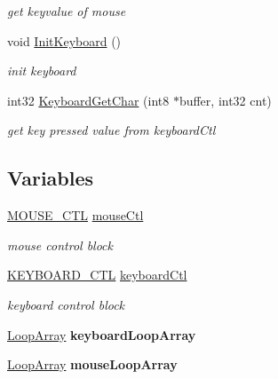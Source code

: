 \begin{DoxyCompactItemize}
\begin{DoxyCompactList}\small\item\em get keyvalue of mouse \end{DoxyCompactList}\item 
void \hyperlink{group__keyboard__mousse_ga76b51f3fb6a339a55ac945dad1272684}{Init\+Keyboard} ()
\begin{DoxyCompactList}\small\item\em init keyboard \end{DoxyCompactList}\item 
int32 \hyperlink{group__keyboard__mousse_gaf9e34965b72e06edbe9d67a16bdfde66}{Keyboard\+Get\+Char} (int8 $\ast$buffer, int32 cnt)
\begin{DoxyCompactList}\small\item\em get key pressed value from keyboard\+Ctl \end{DoxyCompactList}\end{DoxyCompactItemize}
\subsection*{Variables}
\begin{DoxyCompactItemize}
\item 
\hypertarget{group__keyboard__mousse_ga9c88598fb7517d3e0cfd01a513829f99}{}\hyperlink{struct_m_o_u_s_e___c_t_l}{M\+O\+U\+S\+E\+\_\+\+C\+T\+L} \hyperlink{group__keyboard__mousse_ga9c88598fb7517d3e0cfd01a513829f99}{mouse\+Ctl}\label{group__keyboard__mousse_ga9c88598fb7517d3e0cfd01a513829f99}

\begin{DoxyCompactList}\small\item\em mouse control block \end{DoxyCompactList}\item 
\hypertarget{group__keyboard__mousse_gadaa56bf70c720efde081a6a778a05f6a}{}\hyperlink{struct_k_e_y_b_o_a_r_d___c_t_l}{K\+E\+Y\+B\+O\+A\+R\+D\+\_\+\+C\+T\+L} \hyperlink{group__keyboard__mousse_gadaa56bf70c720efde081a6a778a05f6a}{keyboard\+Ctl}\label{group__keyboard__mousse_gadaa56bf70c720efde081a6a778a05f6a}

\begin{DoxyCompactList}\small\item\em keyboard control block \end{DoxyCompactList}\item 
\hypertarget{group__keyboard__mousse_ga6d77af0e052543e6b5e2935790fdc35e}{}\hyperlink{struct_loop_array}{Loop\+Array} {\bfseries keyboard\+Loop\+Array}\label{group__keyboard__mousse_ga6d77af0e052543e6b5e2935790fdc35e}

\item 
\hypertarget{group__keyboard__mousse_gab332656e915f5bbf0da70909979f1d27}{}\hyperlink{struct_loop_array}{Loop\+Array} {\bfseries mouse\+Loop\+Array}\label{group__keyboard__mousse_gab332656e915f5bbf0da70909979f1d27}

\end{DoxyCompactItemize}


